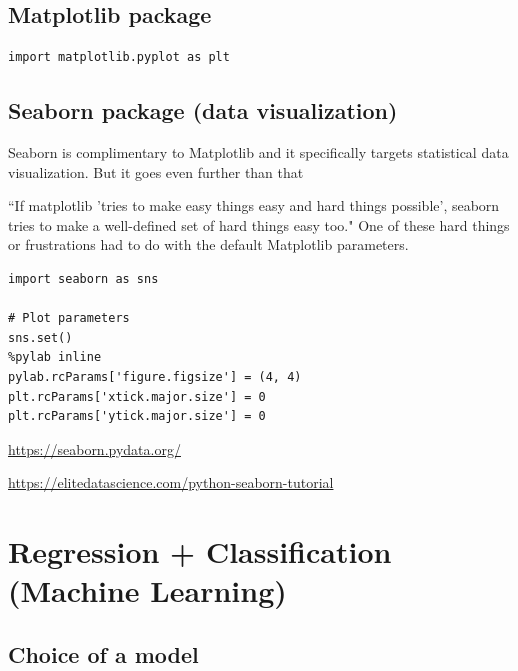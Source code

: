 \section{Matplotlib package}

\begin{lstlisting}
import matplotlib.pyplot as plt
\end{lstlisting}

\section{Seaborn package (data visualization)}
\label{sec:seaborn}

Seaborn is complimentary to Matplotlib and it specifically targets statistical
data visualization. But it goes even further than that
 
``If matplotlib 'tries to make easy things easy and hard things possible',
seaborn tries to make a well-defined set of hard things easy too." 
One of these hard things or frustrations had to do with the default Matplotlib
parameters.

\begin{lstlisting}
import seaborn as sns

# Plot parameters
sns.set()
%pylab inline
pylab.rcParams['figure.figsize'] = (4, 4)
plt.rcParams['xtick.major.size'] = 0
plt.rcParams['ytick.major.size'] = 0
\end{lstlisting}
\url{https://seaborn.pydata.org/}

\url{https://elitedatascience.com/python-seaborn-tutorial}

\chapter{Regression + Classification (Machine Learning)}

\section{Choice of a model}

